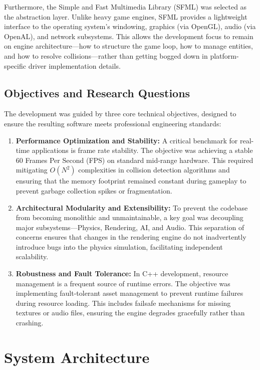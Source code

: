 \documentclass[10pt, a4paper]{article}
\begin{document}
Furthermore, the Simple and Fast Multimedia Library (SFML) was selected as the abstraction layer. Unlike heavy game engines, SFML provides a lightweight interface to the operating system's windowing, graphics (via OpenGL), audio (via OpenAL), and network subsystems. This allows the development focus to remain on engine architecture—how to structure the game loop, how to manage entities, and how to resolve collisions—rather than getting bogged down in platform-specific driver implementation details.

\subsection{Objectives and Research Questions}
The development was guided by three core technical objectives, designed to ensure the resulting software meets professional engineering standards:

\begin{enumerate}
    \item \textbf{Performance Optimization and Stability:} A critical benchmark for real-time applications is frame rate stability. The objective was achieving a stable 60 Frames Per Second (FPS) on standard mid-range hardware. This required mitigating $O(N^2)$ complexities in collision detection algorithms and ensuring that the memory footprint remained constant during gameplay to prevent garbage collection spikes or fragmentation.
    
    \item \textbf{Architectural Modularity and Extensibility:} To prevent the codebase from becoming monolithic and unmaintainable, a key goal was decoupling major subsystems—Physics, Rendering, AI, and Audio. This separation of concerns ensures that changes in the rendering engine do not inadvertently introduce bugs into the physics simulation, facilitating independent scalability.
    
    \item \textbf{Robustness and Fault Tolerance:} In C++ development, resource management is a frequent source of runtime errors. The objective was implementing fault-tolerant asset management to prevent runtime failures during resource loading. This includes failsafe mechanisms for missing textures or audio files, ensuring the engine degrades gracefully rather than crashing.
\end{enumerate}

\newpage

\section{System Architecture}
\end{document}
